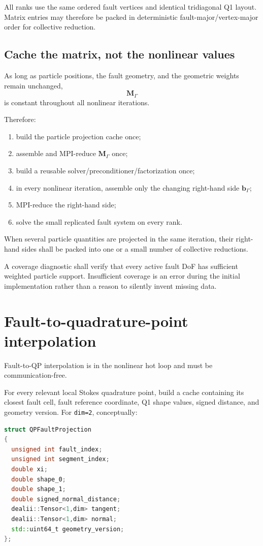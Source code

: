 \documentclass[11pt]{article}
\begin{document}
All ranks use the same ordered fault vertices and identical tridiagonal Q1
layout. Matrix entries may therefore be packed in deterministic
fault-major/vertex-major order for collective reduction.

\subsection{Cache the matrix, not the nonlinear values}
As long as particle positions, the fault geometry, and the geometric weights remain unchanged,
\[
\mathbf{M}_\Gamma
\]
is constant throughout all nonlinear iterations.

Therefore:
\begin{enumerate}
  \item build the particle projection cache once;
  \item assemble and MPI-reduce $\mathbf{M}_\Gamma$ once;
  \item build a reusable solver/preconditioner/factorization once;
  \item in every nonlinear iteration, assemble only the changing right-hand side $\mathbf{b}_\Gamma$;
  \item MPI-reduce the right-hand side;
  \item solve the small replicated fault system on every rank.
\end{enumerate}

When several particle quantities are projected in the same iteration, their right-hand sides shall be packed into one or a small number of collective reductions.

A coverage diagnostic shall verify that every active fault DoF has sufficient weighted particle support.  Insufficient coverage is an error during the initial implementation rather than a reason to silently invent missing data.

\section{Fault-to-quadrature-point interpolation}

Fault-to-QP interpolation is in the nonlinear hot loop and must be communication-free.

For every relevant local Stokes quadrature point, build a cache containing its closest fault cell, fault reference coordinate, Q1 shape values, signed distance, and geometry version.  For \texttt{dim=2}, conceptually:
\begin{lstlisting}[language=C++]
struct QPFaultProjection
{
  unsigned int fault_index;
  unsigned int segment_index;
  double xi;
  double shape_0;
  double shape_1;
  double signed_normal_distance;
  dealii::Tensor<1,dim> tangent;
  dealii::Tensor<1,dim> normal;
  std::uint64_t geometry_version;
};
\end{lstlisting}
\end{document}
